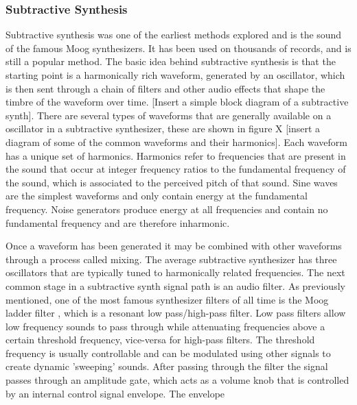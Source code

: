 \subsubsection{Subtractive Synthesis}
Subtractive synthesis was one of the earliest methods explored and is the sound of the famous Moog synthesizers. It has been used on thousands of records, and is still a popular method. The basic idea behind subtractive synthesis is that the starting point is a harmonically rich waveform, generated by an oscillator, which is then sent through a chain of filters and other audio effects that shape the timbre of the waveform over time. [Insert a simple block diagram of a subtractive synth]. There are several types of waveforms that are generally available on a oscillator in a subtractive synthesizer, these are shown in figure X [insert a diagram of some of the common waveforms and their harmonics]. Each waveform has a unique set of harmonics. Harmonics refer to frequencies that are present in the sound that occur at integer frequency ratios to the fundamental frequency of the sound, which is associated to the perceived pitch of that sound. Sine waves are the simplest waveforms and only contain energy at the fundamental frequency. Noise generators produce energy at all frequencies and contain no fundamental frequency and are therefore inharmonic.

Once a waveform has been generated it may be combined with other waveforms through a process called mixing. The average subtractive synthesizer has three oscillators \cite{russ2012sound} that are typically tuned to harmonically related frequencies. The next common stage in a subtractive synth signal path is an audio filter. As previously mentioned, one of the most famous synthesizer filters of all time is the Moog ladder filter \cite{moog1965voltage}, which is a resonant low pass/high-pass filter. Low pass filters allow low frequency sounds to pass through while attenuating frequencies above a certain threshold frequency, vice-versa for high-pass filters. The threshold frequency is usually controllable and can be modulated using other signals to create dynamic 'sweeping' sounds. After passing through the filter the signal passes through an amplitude gate, which acts as a volume knob that is controlled by an internal control signal envelope. The envelope 



